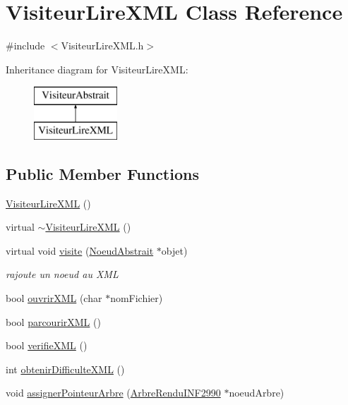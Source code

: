 \hypertarget{class_visiteur_lire_x_m_l}{\section{Visiteur\-Lire\-X\-M\-L Class Reference}
\label{class_visiteur_lire_x_m_l}
}


{\ttfamily \#include $<$Visiteur\-Lire\-X\-M\-L.\-h$>$}

Inheritance diagram for Visiteur\-Lire\-X\-M\-L\-:\begin{figure}[H]
\begin{center}
\leavevmode
\includegraphics[height=2.000000cm]{class_visiteur_lire_x_m_l}
\end{center}
\end{figure}
\subsection*{Public Member Functions}
\begin{DoxyCompactItemize}
\item 
\hyperlink{group__inf2990_gabeaa33d74fa6470ce5f9235c0cb97bb0}{Visiteur\-Lire\-X\-M\-L} ()
\item 
virtual \hyperlink{group__inf2990_gab082fa6b075cc0fa3bd91b8f5db741e1}{$\sim$\-Visiteur\-Lire\-X\-M\-L} ()
\item 
virtual void \hyperlink{group__inf2990_gabbab5bf6d7a4d1a67fbcb4714934683c}{visite} (\hyperlink{class_noeud_abstrait}{Noeud\-Abstrait} $\ast$objet)
\begin{DoxyCompactList}\small\item\em rajoute un noeud au X\-M\-L \end{DoxyCompactList}\item 
bool \hyperlink{group__inf2990_ga77f215ec651ba365b1dc2beb3b13b5ff}{ouvrir\-X\-M\-L} (char $\ast$nom\-Fichier)
\item 
bool \hyperlink{group__inf2990_ga7ca7e156537faace12fc1987273be671}{parcourir\-X\-M\-L} ()
\item 
bool \hyperlink{group__inf2990_ga52c6b4fe698b8638364ab2de036b6b90}{verifie\-X\-M\-L} ()
\item 
int \hyperlink{group__inf2990_ga94a211ae5a640631ff8c9d2eb0715f03}{obtenir\-Difficulte\-X\-M\-L} ()
\item 
void \hyperlink{group__inf2990_gac80610f4b6839aad8400eb1608d6b383}{assigner\-Pointeur\-Arbre} (\hyperlink{class_arbre_rendu_i_n_f2990}{Arbre\-Rendu\-I\-N\-F2990} $\ast$noeud\-Arbre)
\end{DoxyCompactItemize}


